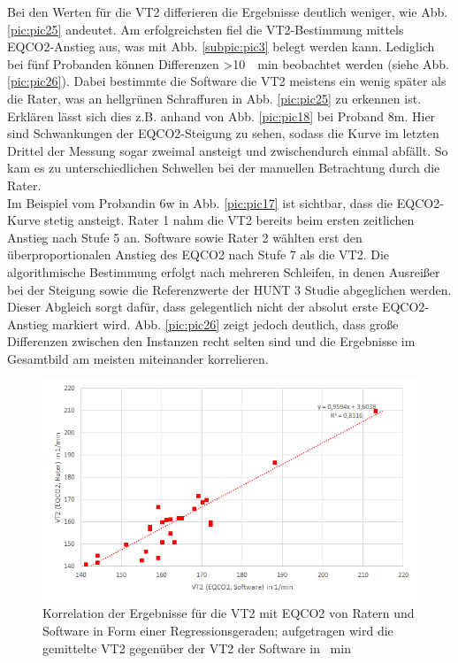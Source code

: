 Bei den Werten für die VT2 differieren die Ergebnisse deutlich weniger, wie Abb. \ref{pic:pic25} andeutet. Am erfolgreichsten fiel die VT2-Bestimmung mittels \acs{EQCO2}-Anstieg aus, was mit Abb. \ref{subpic:pic3} belegt werden kann. Lediglich bei fünf Probanden können Differenzen >\SI{10}{\per\minute} beobachtet werden (siehe Abb. \ref{pic:pic26}). Dabei bestimmte die Software die VT2 meistens ein wenig später als die Rater, was an hellgrünen Schraffuren in Abb. \ref{pic:pic25} zu erkennen ist. Erklären lässt sich dies z.B. anhand von Abb. \ref{pic:pic18} bei Proband 8m. Hier sind Schwankungen der \acs{EQCO2}-Steigung zu sehen, sodass die Kurve im letzten Drittel der Messung sogar zweimal ansteigt und zwischendurch einmal abfällt. So kam es zu unterschiedlichen Schwellen bei der manuellen Betrachtung durch die Rater.\\
Im Beispiel vom Probandin 6w in Abb. \ref{pic:pic17} ist sichtbar, dass die \acs{EQCO2}-Kurve stetig ansteigt. Rater 1 nahm die VT2 bereits beim ersten zeitlichen Anstieg nach Stufe 5 an. Software sowie Rater 2 wählten erst den überproportionalen Anstieg des \acs{EQCO2} nach Stufe 7 als die VT2. Die algorithmische Bestimmung erfolgt nach mehreren Schleifen, in denen Ausreißer bei der Steigung sowie die Referenzwerte der HUNT 3 Studie abgeglichen werden. Dieser Abgleich sorgt dafür, dass gelegentlich nicht der absolut erste \acs{EQCO2}-Anstieg markiert wird. Abb. \ref{pic:pic26} zeigt jedoch deutlich, dass große Differenzen zwischen den Instanzen recht selten sind und die Ergebnisse im Gesamtbild am meisten miteinander korrelieren.

\begin{figure}[H]
	\centering
	\includegraphics[scale=0.7]{Bilder/r_eqco2}
	\caption[Korrelation der \acs{EQCO2}-Ergebnisse von Ratern und Software]{Korrelation der Ergebnisse für die VT2 mit \acs{EQCO2} von Ratern und Software in Form einer Regressionsgeraden; aufgetragen wird die gemittelte VT2 gegenüber der VT2 der Software in \si{\per\minute}}
	\label{pic:pic28}
\end{figure}

